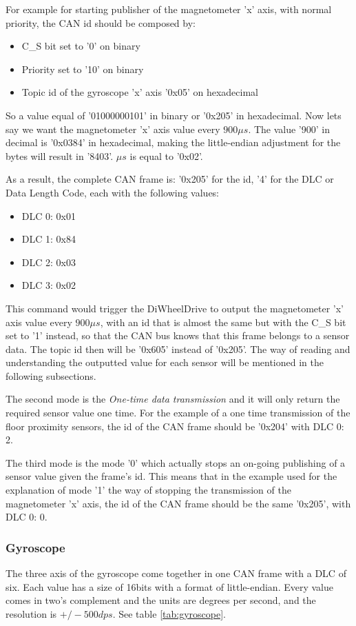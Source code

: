 \documentclass[12pt]{report}%
\begin{document}
For example for starting publisher of the magnetometer 'x' axis, with normal priority, the CAN id should be composed by:
\begin{itemize}
	\item C\_S bit set to '0' on binary
	\item Priority set to '10' on binary
	\item Topic id of the gyroscope 'x' axis '0x05' on hexadecimal
\end{itemize}

So a value equal of '01000000101' in binary or '0x205' in hexadecimal. Now lets say we want the magnetometer 'x' axis value every $900\mu s$. The value '900' in decimal is '0x0384' in hexadecimal, making the little-endian adjustment for the bytes will result in '8403'. $\mu s$ is equal to '0x02'.

As a result, the complete CAN frame is: '0x205' for the id, '4' for the DLC or Data Length Code, each with the following values:

\begin{itemize}
	\item DLC 0: 0x01
	\item DLC 1: 0x84
	\item DLC 2: 0x03
	\item DLC 3: 0x02
\end{itemize}

This command would trigger the DiWheelDrive to output the magnetometer 'x' axis value every $900\mu s$, with an id that is almost the same but with the C\_S bit set to '1' instead, so that the CAN bus knows that this frame belongs to a sensor data. The topic id then will be '0x605' instead of '0x205'. The way of reading and understanding the outputted value for each sensor will be mentioned in the following subsections.

The second mode is the \textit{One-time data transmission} and it will only return the required sensor value one time. For the example of a one time transmission of the floor proximity sensors, the id of the CAN frame should be '0x204' with DLC 0: 2.

The third mode is the mode '0' which actually stops an on-going publishing of a sensor value given the frame's id. This means that in the example used for the explanation of mode '1' the way of stopping the transmission of the magnetometer 'x' axis, the id of the CAN frame should be the same '0x205', with DLC 0: 0.

\subsubsection{Gyroscope}
The three axis of the gyroscope come together in one CAN frame with a DLC of six. Each value has a size of 16bits with a format  of little-endian. Every value comes in two's complement and the units are degrees per second, and the resolution is $+/-500 dps$. See table \ref{tab:gyroscope}.
\end{document}

